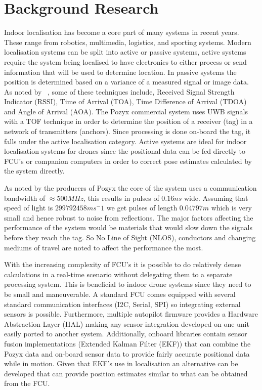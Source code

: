 \section{Background Research}\label{sec:background}
Indoor localisation has become a core part of many systems in recent years.
These range from robotics, multimedia, logistics, and sporting systems.
Modern localisation systems can be split into active or passive systems, active systems require the system being localised to have electronics to either process or send information that will be used to determine location.
In passive systems the position is determined  based on a variance of a measured signal or image data.
As noted by ~\cite{deak2012survey}, some of these techniques include, Received Signal Strength Indicator (RSSI), Time of Arrival (TOA), Time Difference of Arrival (TDOA) and Angle of Arrival (AOA).
The Pozyx commercial system uses UWB signals with a TOF technique in order to determine the position of a receiver (tag) in a network of transmitters (anchors).
Since processing is done on-board the tag, it falls under the active localisation category.
Active systems are ideal for indoor localisation systems for drones since the positional data can be fed directly to FCU's or companion computers in order to correct pose estimates calculated by the system directly.

As noted by the producers of Pozyx the core of the system uses a communication bandwidth of $\approx 500M Hz$, this results in pulses of $0.16ns$ wide.
Assuming that speed of light is $299792458ms^-1$ we get pulses of length $0.04797m$ which is very small and hence robust to noise from reflections.
The major factors affecting the performance of the system would be materials that would slow down the signals before they reach the tag.
So No Line of Sight (NLOS), conductors and changing mediums of travel are noted to affect the performance the most.

With the increasing complexity of FCU's it is possible to do relatively dense calculations in a real-time scenario without delegating them to a separate processing system.
This is beneficial to indoor drone systems since they need to be small and maneuverable.
A standard FCU comes equipped with several standard communication interfaces (I2C, Serial, SPI) so integrating external sensors is possible.
Furthermore, multiple autopilot firmware provides a Hardware Abstraction Layer (HAL) making any sensor integration developed on one unit easily ported to another system.
Additionally, onboard libraries contain sensor fusion implementations (Extended Kalman Filter (EKF)) that can combine the Pozyx data and on-board sensor data to provide fairly accurate positional data while in motion.
Given that EKF's use in localisation an alternative can be developed that can provide position estimates similar to what can be obtained from the FCU.